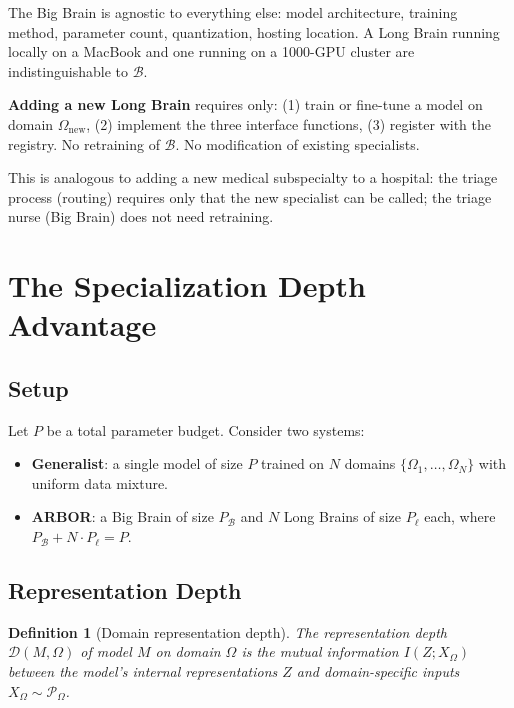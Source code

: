 \documentclass[12pt]{article}
\newtheorem{definition}{Definition}
\begin{document}
The Big Brain is agnostic to everything else: model architecture, training method, parameter count, quantization, hosting location. A Long Brain running locally on a MacBook and one running on a 1000-GPU cluster are indistinguishable to $\mathcal{B}$.

\textbf{Adding a new Long Brain} requires only: (1) train or fine-tune a model on domain $\Omega_{\text{new}}$, (2) implement the three interface functions, (3) register with the registry. No retraining of $\mathcal{B}$. No modification of existing specialists.

This is analogous to adding a new medical subspecialty to a hospital: the triage process (routing) requires only that the new specialist can be called; the triage nurse (Big Brain) does not need retraining.

\section{The Specialization Depth Advantage}
\label{sec:depth}

\subsection{Setup}

Let $P$ be a total parameter budget. Consider two systems:

\begin{itemize}
    \item \textbf{Generalist}: a single model of size $P$ trained on $N$ domains $\{\Omega_1, \ldots, \Omega_N\}$ with uniform data mixture.
    \item \textbf{ARBOR}: a Big Brain of size $P_\mathcal{B}$ and $N$ Long Brains of size $P_\ell$ each, where $P_\mathcal{B} + N \cdot P_\ell = P$.
\end{itemize}

\subsection{Representation Depth}

\begin{definition}[Domain representation depth]
The representation depth $\mathcal{D}(M, \Omega)$ of model $M$ on domain $\Omega$ is the mutual information $I(Z; X_\Omega)$ between the model's internal representations $Z$ and domain-specific inputs $X_\Omega \sim \mathcal{P}_\Omega$.
\end{definition}
\end{document}
